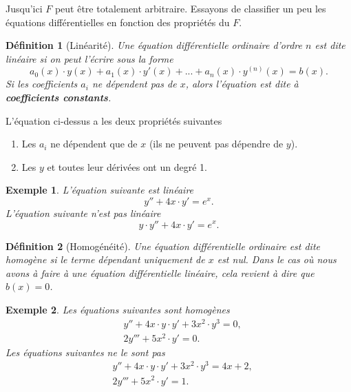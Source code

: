 \documentclass[a4paper,12pt]{book}
\newtheorem{definition}{Définition}
\newtheorem*{exemple}{Exemple}
\begin{document}
Jusqu'ici $F$ peut être totalement arbitraire. Essayons de classifier un peu les équations différentielles 
en fonction des propriétés du $F$. 
\begin{definition}[Linéarité]
 Une équation différentielle ordinaire d'ordre $n$ est dite linéaire si on peut l'écrire sous la forme
 \begin{equation}
  a_0(x)\cdot y(x)+a_1(x)\cdot y'(x)+...+a_n(x)\cdot y^{(n)}(x)=b(x).
 \end{equation}
 Si les coefficients $a_i$ ne dépendent pas de $x$, alors l'équation est dite à \textbf{coefficients constants}.
\end{definition}
L'équation ci-dessus a les deux propriétés suivantes
\begin{enumerate}
 \item Les $a_i$ ne dépendent que de $x$ (ils ne peuvent pas dépendre de $y$).
 \item Les $y$ et toutes leur dérivées ont un degré 1.
\end{enumerate}
\begin{exemple}
 L'équation suivante est linéaire
 \begin{equation}
  y''+4x\cdot y'=e^x.
 \end{equation}
L'équation suivante n'est pas linéaire
 \begin{equation}
  y\cdot y''+4x\cdot y'=e^x.
 \end{equation}
\end{exemple}

\begin{definition}[Homogénéité]
 Une équation différentielle ordinaire est dite homogène si le terme dépendant uniquement de $x$ est nul.
 Dans le cas où nous avons à faire à une équation différentielle linéaire, cela revient à dire que $b(x)=0$.
\end{definition}

\begin{exemple}
 Les équations suivantes sont homogènes
 \begin{align}
  &y''+4x\cdot y\cdot y'+3x^2\cdot y^3=0,\\
  &2y'''+5x^2\cdot y'=0.
 \end{align}
Les équations suivantes ne le sont pas
 \begin{align}
  &y''+4x\cdot y\cdot y'+3x^2\cdot y^3=4x+2,\\
  &2y'''+5x^2\cdot y'=1.
 \end{align}
\end{exemple}
\end{document}
